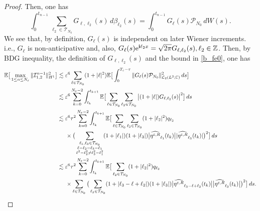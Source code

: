 \documentclass[a4paper]{amsart}
\begin{document}
\begin{proof}
   Then, one has
   $$
   \int_0^{t_{n-1}} \sum_{\ell_2\in\mathcal{T}_{N_0}}G_{\ell,\ell_2}(s)\,d\beta_{\ell_2}(s) = \int_0^{t_{n-1}} G_{\ell}(s)\mathcal{P}_{N_0} \,dW(s).
   $$
   We see that, by definition, $G_{\ell}(s)$ is independent on later Wiener increments. i.e., $G_{\ell}$ is non-anticipative and, also, $G_{\ell}(s){\rm e}^{{\bf i}\ell_2 x} = \sqrt{2\pi}G_{\ell,\ell_2}(s), \ell_2\in\mathbb{Z}$.
   Then, by BDG inequality, the definition of $G_{\ell,\ell_2}(s)$ and the bound in \eqref{b_fe0}, one has
   \begin{align*}
       \mathbb{E}\big[\max_{1\le n\le N_\varepsilon} \|\mathcal{I}_{1,2}^{n-1} \|^2_{H^1}\big]&\lesssim \varepsilon^6 \sum_{\ell\in\mathcal{T}_{N_0}} (1+|\ell|^2)\mathbb{E}\big[
       \int_0^{T_{\varepsilon}-\tau} \|G_{\ell}(s)\mathcal{P}_{N_0}\|^2_{\mathcal{L}_2(L^2;\mathbb{C})}\,ds\big]\\
       &\lesssim \varepsilon^6 \sum_{k=0}^{N_\varepsilon-2}\int_{t_k}^{t_{k+1}} \mathbb{E}\big[\sum_{\ell\in\mathcal{T}_{N_0}}\sum_{\ell_2\in\mathcal{T}_{N_0}}\big|(1+|\ell|)G_{\ell,\ell_2}(s)\big|^2 \big]\,ds\\
      & \lesssim \varepsilon^6 \tau^2 \sum_{k=0}^{N_\varepsilon-2}\int_{t_k}^{t_{k+1}} \mathbb{E}\big[ \sum_{\ell\in\mathcal{T}_{N_0}} 
      \sum_{\ell_2\in\mathcal{T}_{N_0}} (1+|\ell_2|^2) q_{\ell_2}\\
       &\hspace{0.5cm}\times \big(\sum_{\substack{\ell_1,\ell_3\in\mathcal{T}_{N_0}\\ \ell-\ell_2=\ell_3-\ell_1\\ \ell^2-\ell_2^2\ne \ell_3^2-\ell_1^2}} (1+|\ell_1|)(1+|\ell_3|) \big|\widehat{\eta^{\varepsilon,R}}_{\ell_1}(t_k)\big| |\widehat{\eta^{\varepsilon,R}}_{\ell_3}(t_k)| \big)^2\big]\,ds\\
       &\lesssim \varepsilon^6 \tau^2 \sum_{k=0}^{N_\varepsilon-2}\int_{t_k}^{t_{k+1}} \mathbb{E}\big[ 
      \sum_{\ell_2\in\mathcal{T}_{N_0}} (1+|\ell_2|^2) q_{\ell_2} \\
       &\hspace{0.5cm}\times \sum_{\ell\in\mathcal{T}_{N_0}}  \big(\sum_{\ell_3\in\mathcal{T}_{N_0}} (1+|\ell_3-\ell+\ell_2|)(1+|\ell_3|) \big|\widehat{\eta^{\varepsilon,R}}_{\ell_3-\ell+\ell_2}(t_k)\big| \big|\widehat{\eta^{\varepsilon,R}}_{\ell_3}(t_k)\big| \big)^2\big]\,ds.
   \end{align*}

\end{proof}
\end{document}
